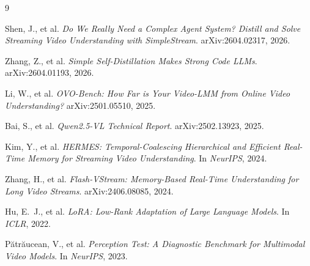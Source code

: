 \documentclass[11pt,a4paper]{article}
\begin{document}
\begin{thebibliography}{9}

Shen, J., et al.
\textit{Do We Really Need a Complex Agent System? Distill and Solve Streaming Video Understanding with SimpleStream}.
arXiv:2604.02317, 2026.

Zhang, Z., et al.
\textit{Simple Self-Distillation Makes Strong Code LLMs}.
arXiv:2604.01193, 2026.

Li, W., et al.
\textit{OVO-Bench: How Far is Your Video-LMM from Online Video Understanding?}
arXiv:2501.05510, 2025.

Bai, S., et al.
\textit{Qwen2.5-VL Technical Report}.
arXiv:2502.13923, 2025.

Kim, Y., et al.
\textit{HERMES: Temporal-Coalescing Hierarchical and Efficient Real-Time Memory for Streaming Video Understanding}.
In \textit{NeurIPS}, 2024.

Zhang, H., et al.
\textit{Flash-VStream: Memory-Based Real-Time Understanding for Long Video Streams}.
arXiv:2406.08085, 2024.

Hu, E.~J., et al.
\textit{LoRA: Low-Rank Adaptation of Large Language Models}.
In \textit{ICLR}, 2022.

P\u{a}tr\u{a}ucean, V., et al.
\textit{Perception Test: A Diagnostic Benchmark for Multimodal Video Models}.
In \textit{NeurIPS}, 2023.

\end{thebibliography}
\end{document}
